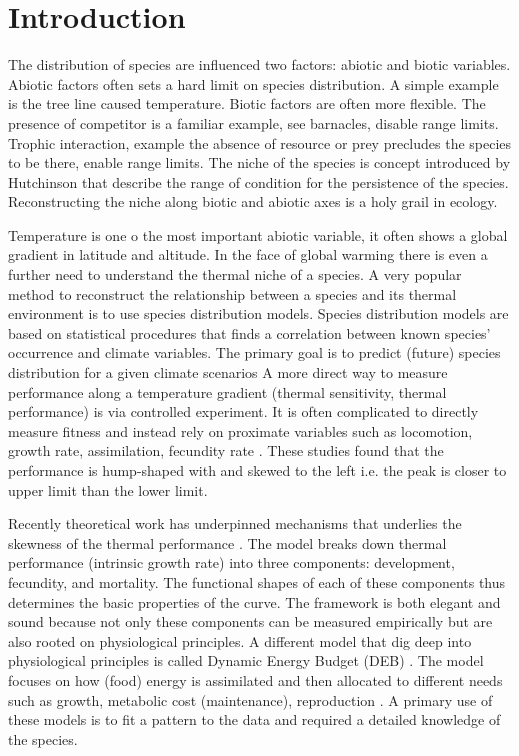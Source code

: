 \section*{Introduction}
The distribution of species are influenced two factors: abiotic and biotic variables.
Abiotic factors often sets a hard limit on species distribution.
A simple example is the tree line caused temperature.
Biotic factors are often more flexible.
The presence of competitor is a familiar example, see barnacles, disable range limits.
Trophic interaction, example the absence of resource or prey precludes the  species to be there, enable range limits.
The niche of the species is concept introduced by Hutchinson that describe the range of condition for the persistence of the species.
Reconstructing the niche along biotic and abiotic axes is a holy grail in ecology. 

Temperature is one o the most important abiotic variable, it often shows a global gradient in latitude and altitude.
In the face of global warming there is even a further need to understand the thermal niche of a species.
A very popular method to reconstruct the relationship between a species and its thermal environment is to use species distribution models. 
Species distribution models are based on statistical procedures that finds a correlation between known species' occurrence and climate variables.
The primary goal is to predict (future) species distribution for a given climate scenarios \citep{Guisan2005, Austin2007, Elith2009}
A more direct way to measure performance along a temperature gradient (thermal sensitivity, thermal performance) is via controlled experiment.
It is often complicated to directly measure fitness and instead rely on proximate variables such as locomotion, growth rate, assimilation, fecundity rate \citep[][and reference therein]{Angilletta2009}.
These studies found that the performance is hump-shaped with and skewed to the left i.e. the peak is closer to upper limit than the lower limit.

Recently theoretical work has underpinned mechanisms that underlies the skewness of the thermal performance \citep{Amarasekare2012}.
The model  breaks down thermal performance (intrinsic growth rate)  into three components: development, fecundity, and mortality.
The functional shapes of each of these components thus determines the basic properties of the curve.
The framework is both elegant and sound because not only these components can be measured empirically but are also rooted on physiological principles.
A different model that dig deep into physiological principles is called Dynamic Energy Budget (DEB) \citep{Kooijman2009}.
The model focuses on how (food) energy is assimilated and then allocated to different needs such as growth, metabolic cost (maintenance), reproduction \citep{Kooijman2009}.
A primary use of  these models is to fit a pattern to the data and required a detailed knowledge of the species.  



